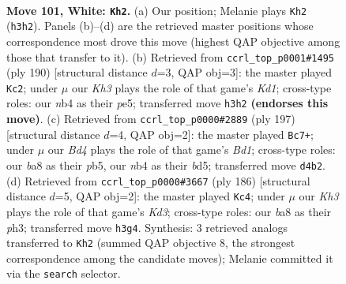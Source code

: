 \documentclass[11pt]{article}
\begin{document}
\clearpage

\begin{figure}[p]\centering
\begin{subfigure}{0.46\textwidth}\centering
\resizebox{\linewidth}{!}{%
\newchessgame
\chessboard[
  setfen={b7/7k/8/8/1n1B4/7K/5P2/8 w - - 47 101},
  showmover=false,
  pgfstyle=straightmove, color=movearrow, markmove={h3-h2}
]}
\caption{}
\end{subfigure}\hfill
\begin{subfigure}{0.46\textwidth}\centering
\resizebox{\linewidth}{!}{%
\newchessgame
\chessboard[
  setfen={8/2k5/8/3Bp3/8/4bP2/8/3K4 w - - 13 96},
  showmover=false,
  pgfstyle=straightmove, color=movearrow, markmove={d1-c2}
]}
\caption{}
\end{subfigure}
\\[4pt]
\begin{subfigure}{0.46\textwidth}\centering
\resizebox{\linewidth}{!}{%
\newchessgame
\chessboard[
  setfen={3b4/8/1p6/1P1B4/8/6K1/8/6k1 b - - 12 99},
  showmover=false,
  pgfstyle=straightmove, color=movearrow, markmove={d8-c7}
]}
\caption{}
\end{subfigure}\hfill
\begin{subfigure}{0.46\textwidth}\centering
\resizebox{\linewidth}{!}{%
\newchessgame
\chessboard[
  setfen={1k6/8/8/1n6/8/3K3p/7P/6B1 w - - 18 94},
  showmover=false,
  pgfstyle=straightmove, color=movearrow, markmove={d3-c4}
]}
\caption{}
\end{subfigure}
\caption{\textbf{Move 101, White: \texttt{Kh2}.} (a) Our position; Melanie plays \texttt{Kh2} (\texttt{h3h2}). Panels (b)--(d) are the retrieved master positions whose correspondence most drove this move (highest QAP objective among those that transfer to it). (b) Retrieved from \texttt{ccrl\_top\_p0001\#1495} (ply 190) [structural distance $d$=3, QAP obj=3]: the master played \texttt{Kc2}; under $\mu$ our \emph{Kh3} plays the role of that game's \emph{Kd1}; cross-type roles: our \emph{n}b4 as their \emph{p}e5; transferred move \texttt{h3h2} \textbf{(endorses this move)}. (c) Retrieved from \texttt{ccrl\_top\_p0000\#2889} (ply 197) [structural distance $d$=4, QAP obj=2]: the master played \texttt{Bc7+}; under $\mu$ our \emph{Bd4} plays the role of that game's \emph{Bd1}; cross-type roles: our \emph{b}a8 as their \emph{p}b5, our \emph{n}b4 as their \emph{b}d5; transferred move \texttt{d4b2}. (d) Retrieved from \texttt{ccrl\_top\_p0000\#3667} (ply 186) [structural distance $d$=5, QAP obj=2]: the master played \texttt{Kc4}; under $\mu$ our \emph{Kh3} plays the role of that game's \emph{Kd3}; cross-type roles: our \emph{b}a8 as their \emph{p}h3; transferred move \texttt{h3g4}. Synthesis: 3 retrieved analogs transferred to \texttt{Kh2} (summed QAP objective 8, the strongest correspondence among the candidate moves); Melanie committed it via the \texttt{search} selector.}
\label{fig:thought-m200}
\end{figure}
\end{document}
